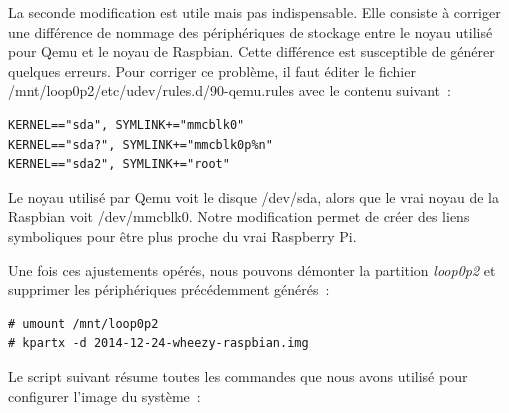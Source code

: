 \documentclass{article}
\begin{document}
La seconde modification est utile mais pas indispensable.
Elle consiste à corriger une différence de nommage des périphériques de stockage entre
le noyau utilisé pour Qemu et le noyau de Raspbian.
Cette différence est susceptible de générer quelques erreurs.
Pour corriger ce problème, il faut éditer le fichier \og{}/mnt/loop0p2/etc/udev/rules.d/90-qemu.rules\fg{}
avec le contenu suivant~:
\begin{verbatim}
KERNEL=="sda", SYMLINK+="mmcblk0"
KERNEL=="sda?", SYMLINK+="mmcblk0p%n"
KERNEL=="sda2", SYMLINK+="root"
\end{verbatim}

Le noyau utilisé par Qemu voit le disque \og{}/dev/sda\fg{}, alors que le
\og{}vrai\fg{} noyau de la Raspbian voit \og{}/dev/mmcblk0\fg{}.
Notre modification permet de créer des liens symboliques pour être plus
proche du vrai Raspberry Pi.

Une fois ces ajustements opérés, nous pouvons démonter la partition {\em
loop0p2} et supprimer les périphériques précédemment générés~:
\begin{verbatim}
# umount /mnt/loop0p2
# kpartx -d 2014-12-24-wheezy-raspbian.img
\end{verbatim}

Le script suivant résume toutes les commandes que nous avons utilisé pour
configurer l'image du système~:

\begin{small}
    
\end{small}



\end{document}
